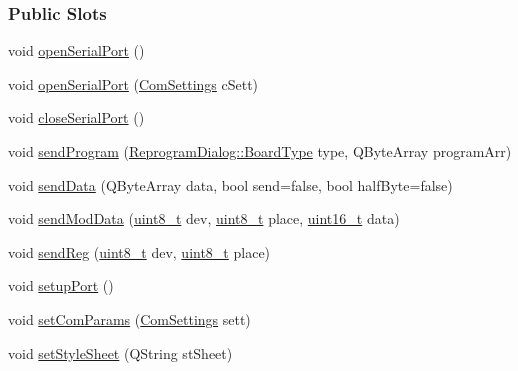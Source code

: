 \subsubsection*{Public Slots}
\begin{DoxyCompactItemize}
\item 
void \mbox{\hyperlink{classSerialPort_ab831db6582a7b576adf5059555e0297f}{open\+Serial\+Port}} ()
\item 
void \mbox{\hyperlink{classSerialPort_ac4f59ca6f1401ed8bbc6de3f99cfa411}{open\+Serial\+Port}} (\mbox{\hyperlink{structComSettings}{Com\+Settings}} c\+Sett)
\item 
void \mbox{\hyperlink{classSerialPort_a075482970cd99f66457eac471127a710}{close\+Serial\+Port}} ()
\item 
void \mbox{\hyperlink{classSerialPort_adc2e6d59b77389c9047aab5bb1ebd5dc}{send\+Program}} (\mbox{\hyperlink{classReprogramDialog_a95e0c039a5de1ea8d3ad44a6ccf17b6a}{Reprogram\+Dialog\+::\+Board\+Type}} type, Q\+Byte\+Array program\+Arr)
\item 
void \mbox{\hyperlink{classSerialPort_a2616700b4daafeb521f222e7d846dc99}{send\+Data}} (Q\+Byte\+Array data, bool send=false, bool half\+Byte=false)
\item 
void \mbox{\hyperlink{classSerialPort_a412616b006e1b16efaf6ffd480cb9cc0}{send\+Mod\+Data}} (\mbox{\hyperlink{settings_8h_a48091a1e52849b0871df2f7081be2e38}{uint8\+\_\+t}} dev, \mbox{\hyperlink{settings_8h_a48091a1e52849b0871df2f7081be2e38}{uint8\+\_\+t}} place, \mbox{\hyperlink{settings_8h_a017dd44e68049ffdd31500a8cd01ba68}{uint16\+\_\+t}} data)
\item 
void \mbox{\hyperlink{classSerialPort_afe266bc6e1641be604b5d97c88910bc4}{send\+Reg}} (\mbox{\hyperlink{settings_8h_a48091a1e52849b0871df2f7081be2e38}{uint8\+\_\+t}} dev, \mbox{\hyperlink{settings_8h_a48091a1e52849b0871df2f7081be2e38}{uint8\+\_\+t}} place)
\item 
void \mbox{\hyperlink{classSerialPort_adf0c6d9bd0a312ae0e921085497fa8b4}{setup\+Port}} ()
\item 
void \mbox{\hyperlink{classSerialPort_ab723ad9ecd8571d2156ad9b141cfd24e}{set\+Com\+Params}} (\mbox{\hyperlink{structComSettings}{Com\+Settings}} sett)
\item 
void \mbox{\hyperlink{classSerialPort_a7dbba05770c1fd93db1026c0e5cc12a7}{set\+Style\+Sheet}} (Q\+String st\+Sheet)
\end{DoxyCompactItemize}
